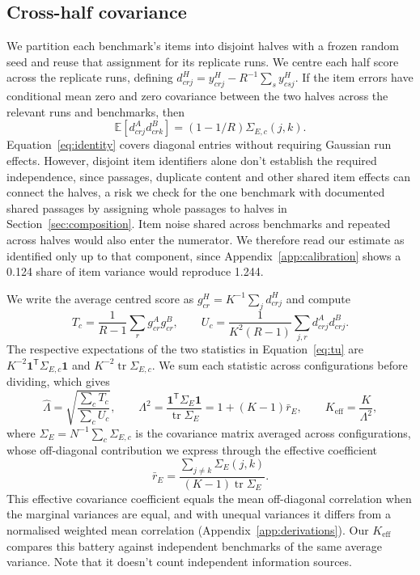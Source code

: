 \documentclass{article}
\newcommand{\Lam}{\Lambda}
\newcommand{\Sig}{\Sigma_E}
\begin{document}
\subsection{Cross-half covariance}
We partition each benchmark's items into disjoint halves with a frozen random seed and reuse that assignment for its replicate runs. We centre each half score across the replicate runs, defining $d^H_{crj}=y^H_{crj}-R^{-1}\sum_s y^H_{csj}$. If the item errors have conditional mean zero and zero covariance between the two halves across the relevant runs and benchmarks, then
\begin{equation}
\mathbb{E}[d^A_{crj}d^B_{crk}]=(1-1/R)\Sigma_{E,c}(j,k).
\label{eq:identity}
\end{equation}
Equation~\ref{eq:identity} covers diagonal entries without requiring Gaussian run effects. However, disjoint item identifiers alone don't establish the required independence, since passages, duplicate content and other shared item effects can connect the halves, a risk we check for the one benchmark with documented shared passages by assigning whole passages to halves in Section~\ref{sec:composition}. Item noise shared across benchmarks and repeated across halves would also enter the numerator. We therefore read our estimate as identified only up to that component, since Appendix~\ref{app:calibration} shows a 0.124 share of item variance would reproduce 1.244.

We write the average centred score as $g^H_{cr}=K^{-1}\sum_j d^H_{crj}$ and compute
\begin{equation}
T_c=\frac{1}{R-1}\sum_r g^A_{cr}g^B_{cr},\qquad
U_c=\frac{1}{K^2(R-1)}\sum_{j,r}d^A_{crj}d^B_{crj}.
\label{eq:tu}
\end{equation}
The respective expectations of the two statistics in Equation~\ref{eq:tu} are $K^{-2}\mathbf{1}^{\mathsf T}\Sigma_{E,c}\mathbf{1}$ and $K^{-2}\operatorname{tr}\Sigma_{E,c}$. We sum each statistic across configurations before dividing, which gives
\begin{equation}
\widehat\Lam=\sqrt{\frac{\sum_c T_c}{\sum_c U_c}},\qquad
\Lam^2=\frac{\mathbf{1}^{\mathsf T}\Sig\mathbf{1}}{\operatorname{tr}\Sig}
=1+(K-1)\bar r_E,\qquad K_{\mathrm{eff}}=\frac{K}{\Lam^2},
\label{eq:lambda}
\end{equation}
where $\Sig=N^{-1}\sum_c\Sigma_{E,c}$ is the covariance matrix averaged across configurations, whose off-diagonal contribution we express through the effective coefficient
\begin{equation}
\bar r_E=\frac{\sum_{j\ne k}\Sigma_E(j,k)}{(K-1)\operatorname{tr}\Sig}.
\label{eq:effective}
\end{equation}
This effective covariance coefficient equals the mean off-diagonal correlation when the marginal variances are equal, and with unequal variances it differs from a normalised weighted mean correlation (Appendix~\ref{app:derivations}). Our $K_{\mathrm{eff}}$ compares this battery against independent benchmarks of the same average variance. Note that it doesn't count independent information sources.
\end{document}
